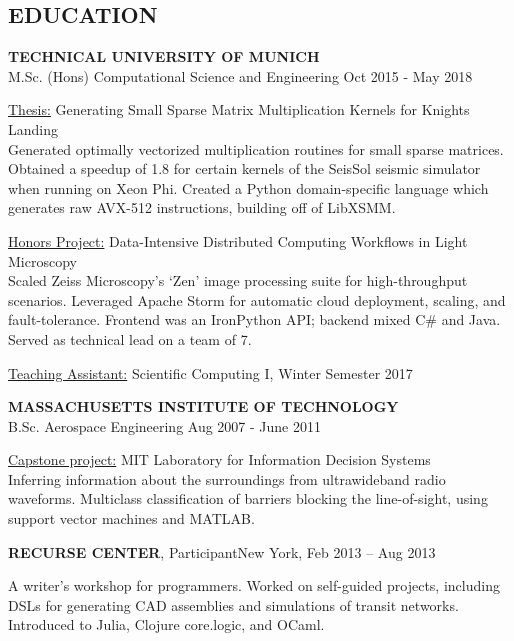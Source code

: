 \documentclass[margin]{res}
\begin{document}
\begin{resume}
	\section{EDUCATION}%
		\textbf{TECHNICAL UNIVERSITY OF MUNICH} \\
		M.Sc. (Hons) Computational Science and Engineering%
		\hfill Oct 2015 - May 2018
		
		\underline{Thesis:} Generating Small Sparse Matrix Multiplication Kernels for Knights Landing \\
			Generated optimally vectorized multiplication routines for small sparse matrices. Obtained a speedup of 1.8 for certain kernels of the SeisSol seismic simulator when running on Xeon Phi. Created a Python domain-specific language which generates raw AVX-512 instructions, building off of LibXSMM. 


		\underline{Honors Project:} Data-Intensive Distributed Computing Workflows in Light Microscopy \\
			Scaled Zeiss Microscopy's `Zen' image processing suite for high-throughput scenarios. Leveraged Apache Storm for automatic cloud deployment, scaling, and fault-tolerance. Frontend was an IronPython API; backend mixed C\# and Java. Served as technical lead on a team of 7. 

		\underline{Teaching Assistant:} Scientific Computing I, Winter Semester 2017



		\textbf{MASSACHUSETTS INSTITUTE OF TECHNOLOGY} \\
		B.Sc. Aerospace Engineering%
		\hfill Aug 2007 - June 2011

		\underline{Capstone project:} MIT Laboratory for Information Decision Systems \\
		Inferring information about the surroundings from ultrawideband radio waveforms. Multiclass classification of barriers blocking the line-of-sight, using support vector machines and MATLAB.

		\textbf{RECURSE CENTER}, Participant\hfill New York, Feb 2013 -- Aug 2013

		A writer's workshop for programmers. Worked on self-guided projects, including DSLs for generating CAD assemblies and simulations of transit networks. Introduced to Julia, Clojure core.logic, and OCaml.





\end{resume}
\end{document}
